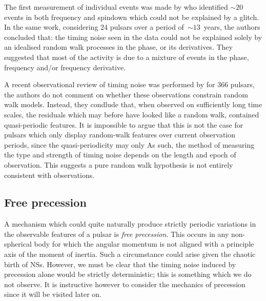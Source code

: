 The first measurement of individual events was made by \citet{Cordes1985} who
identified $\sim20$ events in both frequency and spindown which could not be
explained by a glitch. In the same work, considering 24 pulsars over a period
of~$\sim13$~years, the authors concluded that: the timing noise seen in the
data could not be explained solely by an idealised random walk processes in the
phase, or its derivatives. They suggested that most of the activity is due to a
mixture of events in the phase, frequency and/or frequency derivative.

A recent observational review of timing noise was performed by
\citet{Hobbs2010} for 366 pulsars, the authors do not comment on whether these
observations constrain random walk models. Instead, they condlude that, when
observed on sufficiently long time scales, the residuals which may before have
looked like a random walk, contained quasi-periodic features. It is impossible
to argue that this is not the case for pulsars which only display random-walk
features over current observation periods, since the quasi-periodicity may only
As such, the method of measuring the type and strength of timing noise depends
on the length and epoch of observation. This suggests a pure random walk
hypothesis is not entirely consistent with observations.

\subsection{Free precession}
\label{sec: free precession}

A mechanism which could quite naturally produce strictly periodic variations in the
observable features of a pulsar is \emph{free precession}. This occurs in any
non-spherical body for which the angular momentum is not aligned with a principle
axis of the moment of inertia. Such a circumstance could arise given the
chaotic birth of NSs. However, we must be clear that the timing noise induced by
precession alone would be strictly deterministic; this is something which we do
not observe.
It is instructive however to consider the mechanics of precession since it will
be visited later on.


